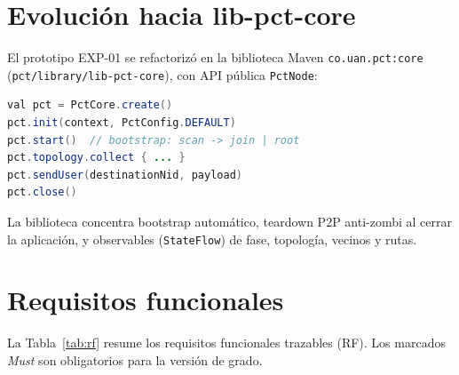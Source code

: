 \section{Evolución hacia lib-pct-core}
\label{sec:evolucion-core}

El prototipo EXP-01 se refactorizó en la biblioteca Maven \texttt{co.uan.pct:core} (\texttt{pct/library/lib-pct-core}), con API pública \texttt{PctNode}:

\begin{lstlisting}[language=Java,caption={API pública PCT (Kotlin)},label={lst:api-pct}]
val pct = PctCore.create()
pct.init(context, PctConfig.DEFAULT)
pct.start()  // bootstrap: scan -> join | root
pct.topology.collect { ... }
pct.sendUser(destinationNid, payload)
pct.close()
\end{lstlisting}

La biblioteca concentra bootstrap automático, teardown P2P anti-zombi al cerrar la aplicación, y observables (\texttt{StateFlow}) de fase, topología, vecinos y rutas.

\section{Requisitos funcionales}
\label{sec:requisitos-funcionales}

La Tabla~\ref{tab:rf} resume los requisitos funcionales trazables (RF). Los marcados \emph{Must} son obligatorios para la versión de grado.

